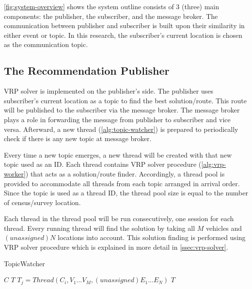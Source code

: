 \documentclass[conference]{IEEEtran}
\begin{document}
\autoref{fig:system-overview} shows the system outline consists of 3 (three) main components: the publisher, the subscriber, and the message broker. The communication between publisher and subscriber is built upon their similarity in either event or topic. In this research, the subscriber's current location is chosen as the communication topic. 


\subsection{The Recommendation Publisher}
\label{ssec:recommendation-publisher}
VRP solver is implemented on the publisher's side. The publisher uses subscriber's current location as a topic to find the best solution/route. This route will be published to the subscriber via the message broker. The message broker plays a role in forwarding the message from publisher to subscriber and vice versa. Afterward, a new thread (\autoref{alg:topic-watcher}) is prepared to periodically check if there is any new topic at message broker. 

Every time a new topic emerges, a new thread will be created with that new topic used as an ID. Each thread contains VRP solver procedure (\autoref{alg:vrp-worker}) that acts as a solution/route finder. Accordingly, a thread pool is provided to accommodate all threads from each topic arranged in arrival order. Since the topic is used as a thread ID, the thread pool size is equal to the number of census/survey location. 


Each thread in the thread pool will be run consecutively, one session for each thread. Every running thread will find the solution by taking all $M$ vehicles and $(unassigned) N$ locations into account. This solution finding is performed using VRP solver procedure which is explained in more detail in \autoref{ssec:vrp-solver}.


\begin{algorithm}[!]
	\caption{TopicWatcher}
	\label{alg:topic-watcher}
	\begin{algorithmic}[1]
		\renewcommand{\algorithmicrequire}{\textbf{Input:}}
		\renewcommand{\algorithmicensure}{\textbf{Output:}}
		\REQUIRE $C$
		\ENSURE  $T$
					\STATE $T_j = Thread(C_i, V_1...V_M, (unassigned) E_1...E_N)$
				\ENDIF
			\ENDFOR
		\ENDFOR
		\RETURN $T$
	\end{algorithmic}
\end{algorithm}
\end{document}
